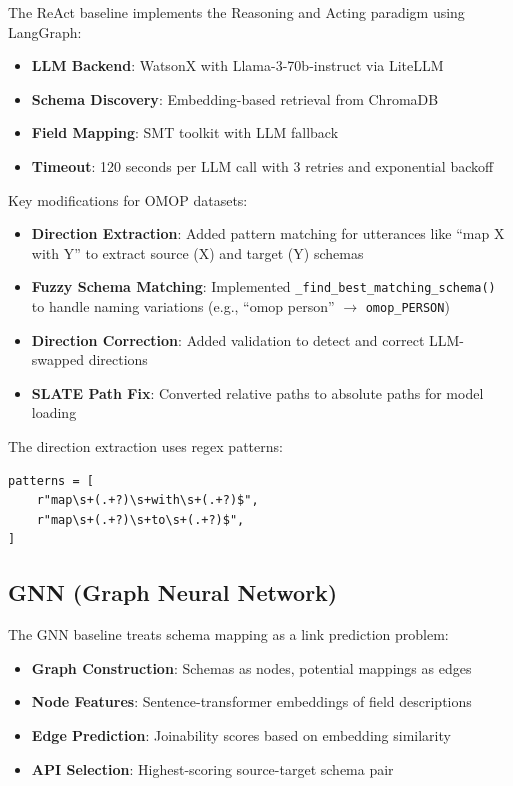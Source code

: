 \documentclass[sigconf, nonacm]{acmart}
\begin{document}
The ReAct baseline implements the Reasoning and Acting paradigm using LangGraph:

\begin{itemize}
    \item \textbf{LLM Backend}: WatsonX with Llama-3-70b-instruct via LiteLLM
    \item \textbf{Schema Discovery}: Embedding-based retrieval from ChromaDB
    \item \textbf{Field Mapping}: SMT toolkit with LLM fallback
    \item \textbf{Timeout}: 120 seconds per LLM call with 3 retries and exponential backoff
\end{itemize}

Key modifications for OMOP datasets:
\begin{itemize}
    \item \textbf{Direction Extraction}: Added pattern matching for utterances like ``map X with Y'' to extract source (X) and target (Y) schemas
    \item \textbf{Fuzzy Schema Matching}: Implemented \texttt{\_find\_best\_matching\_schema()} to handle naming variations (e.g., ``omop person'' $\rightarrow$ \texttt{omop\_PERSON})
    \item \textbf{Direction Correction}: Added validation to detect and correct LLM-swapped directions
    \item \textbf{SLATE Path Fix}: Converted relative paths to absolute paths for model loading
\end{itemize}

The direction extraction uses regex patterns:
\begin{verbatim}
patterns = [
    r"map\s+(.+?)\s+with\s+(.+?)$",
    r"map\s+(.+?)\s+to\s+(.+?)$",
]
\end{verbatim}

\subsection{GNN (Graph Neural Network)}

The GNN baseline treats schema mapping as a link prediction problem:

\begin{itemize}
    \item \textbf{Graph Construction}: Schemas as nodes, potential mappings as edges
    \item \textbf{Node Features}: Sentence-transformer embeddings of field descriptions
    \item \textbf{Edge Prediction}: Joinability scores based on embedding similarity
    \item \textbf{API Selection}: Highest-scoring source-target schema pair
\end{itemize}
\end{document}
